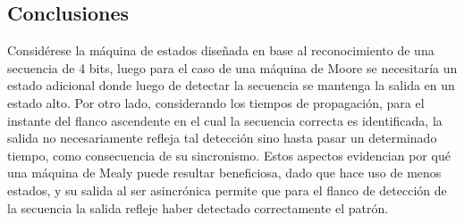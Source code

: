 \subsection{Conclusiones}
Consid\'erese la m\'aquina de estados dise\~nada en base al reconocimiento de una secuencia de 4 bits, luego
para el caso de una m\'aquina de Moore se necesitar\'ia un estado adicional donde luego de detectar la secuencia se mantenga la salida en un estado alto. Por otro lado,
considerando los tiempos de propagaci\'on, para el instante del flanco ascendente en el cual la secuencia correcta es identificada, la salida no necesariamente refleja tal detecci\'on
sino hasta pasar un determinado tiempo, como consecuencia de su sincronismo.
Estos aspectos evidencian por qu\'e una m\'aquina de Mealy puede resultar beneficiosa, dado que hace uso de menos estados, y su salida al ser asincr\'onica permite que
para el flanco de detecci\'on de la secuencia la salida refleje haber detectado correctamente el patr\'on.
